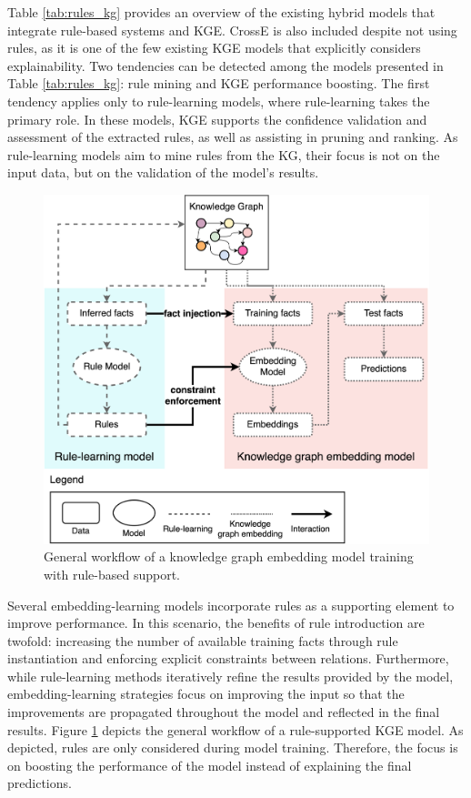 Table \ref{tab:rules_kg} provides an overview of the existing hybrid models that integrate rule-based systems and KGE. CrossE \citep{crosse} is also included despite not using rules, as it is one of the few existing KGE models that explicitly considers explainability. Two tendencies can be detected among the models presented in Table \ref{tab:rules_kg}: rule mining and KGE performance boosting. The first tendency applies only to rule-learning models, where rule-learning takes the primary role. In these models, KGE supports the confidence validation and assessment of the extracted rules, as well as assisting in pruning and ranking. As rule-learning models aim to mine rules from the KG, their focus is not on the input data, but on the validation of the model's results.

\begin{figure}[t]
    \centering
    \includegraphics[width=.7\linewidth]{6_kbsextractiondl/figures/rule_support_training.eps}
    \caption{General workflow of a knowledge graph embedding model training with rule-based support.}
    \label{fig:rule_training}
\end{figure}

Several embedding-learning models incorporate rules as a supporting element to improve performance. In this scenario, the benefits of rule introduction are twofold: increasing the number of available training facts through rule instantiation and enforcing explicit constraints between relations. Furthermore, while rule-learning methods iteratively refine the results provided by the model, embedding-learning strategies focus on improving the input so that the improvements are propagated throughout the model and reflected in the final results. Figure \ref{fig:rule_training} depicts the general workflow of a rule-supported KGE model. As depicted, rules are only considered during model training. Therefore, the focus is on boosting the performance of the model instead of explaining the final predictions.

